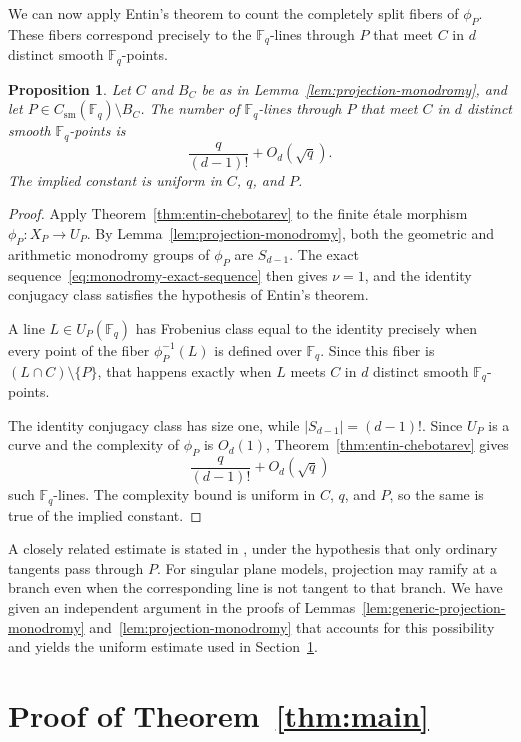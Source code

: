 \documentclass[10pt,a4paper]{amsart}
\newtheorem{proposition}[theorem]{Proposition}
\theoremstyle{definition}
\theoremstyle{remark}
\newcommand{\Fq}{\mathbb{F}_q}
\begin{document}
We can now apply Entin's theorem to count the completely split fibers of $\phi_P$. These fibers correspond precisely to the $\Fq$-lines through $P$ that meet $C$ in $d$ distinct smooth $\Fq$-points.

\begin{proposition}\label{prop:degree}
Let $C$ and $B_C$ be as in Lemma~\ref{lem:projection-monodromy}, and let
$P\in C_{\mathrm{sm}}(\Fq)\setminus B_C$. The number of $\Fq$-lines
through $P$ that meet $C$ in $d$ distinct smooth $\Fq$-points is
\[
\frac{q}{(d-1)!}+O_d(\sqrt q).
\]
The implied constant is uniform in $C$, $q$, and $P$.
\end{proposition}

\begin{proof}
Apply Theorem~\ref{thm:entin-chebotarev} to the finite \'etale morphism
$\phi_P\colon X_P\to U_P$. By Lemma~\ref{lem:projection-monodromy}, both the geometric and arithmetic monodromy groups of $\phi_P$ are $S_{d-1}$. The exact sequence~\eqref{eq:monodromy-exact-sequence} then gives $\nu=1$, and the identity conjugacy class satisfies the hypothesis of Entin's theorem.

A line $L\in U_P(\Fq)$ has Frobenius class equal to the identity precisely when every point of the fiber $\phi_P^{-1}(L)$ is defined over $\Fq$. Since this fiber is $(L\cap C)\setminus\{P\}$, that happens exactly when $L$ meets $C$ in $d$ distinct smooth $\Fq$-points.

The identity conjugacy class has size one, while $|S_{d-1}|=(d-1)!$. Since $U_P$ is a curve and the complexity of $\phi_P$ is $O_d(1)$, Theorem~\ref{thm:entin-chebotarev} gives
\[
\frac{q}{(d-1)!}+O_d(\sqrt q)
\]
such $\Fq$-lines. The complexity bound is uniform in $C$, $q$, and $P$, so the same is true of the implied constant.
\end{proof}


A closely related estimate is stated in
\cite[Proposition~10]{Die12}, under the hypothesis that only
ordinary tangents pass through $P$. For singular plane models, projection may ramify at a branch even when the corresponding line is not tangent to that branch. We have given an independent argument in the proofs of
Lemmas~\ref{lem:generic-projection-monodromy} and~\ref{lem:projection-monodromy} that accounts for this
possibility and yields the uniform estimate used in
Section~\ref{sec:main-thm}.


\section{Proof of Theorem~\ref{thm:main}}\label{sec:main-thm}
\end{document}

